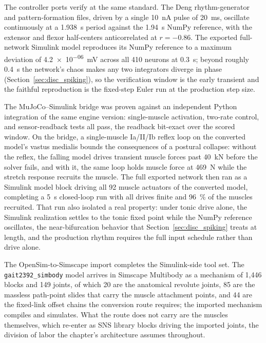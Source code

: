 The controller ports verify at the same standard. The Deng rhythm-generator and pattern-formation files, driven by a single \qty{10}{\nA} pulse of \qty{20}{\milli\second}, oscillate continuously at a \qty{1.938}{\second} period against the \qty{1.94}{\second} NumPy reference, with the extensor and flexor half-centers anticorrelated at $r = -0.86$. The exported full-network Simulink model reproduces its NumPy reference to a maximum deviation of \qty{4.2e-06}{\milli\volt} across all 410 neurons at \qty{0.3}{\second}; beyond roughly \qty{0.4}{\second} the network's chaos makes any two integrators diverge in phase (Section~\ref{sec:disc_spiking}), so the verification window is the early transient and the faithful reproduction is the fixed-step Euler run at the production step size.

The MuJoCo--Simulink bridge was proven against an independent Python integration of the same engine version: single-muscle activation, two-rate control, and sensor-readback tests all pass, the readback bit-exact over the scored window. On the bridge, a single-muscle Ia/II/Ib reflex loop on the converted model's vastus medialis bounds the consequences of a postural collapse: without the reflex, the falling model drives transient muscle forces past \qty{40}{\kilo\newton} before the solver fails, and with it, the same loop holds muscle force at \qty{469}{\newton} while the stretch response recruits the muscle. The full exported network then ran as a Simulink model block driving all 92 muscle actuators of the converted model, completing a \qty{5}{\second} closed-loop run with all drives finite and \qty{96}{\percent} of the muscles recruited. That run also isolated a real property: under tonic drive alone, the Simulink realization settles to the tonic fixed point while the NumPy reference oscillates, the near-bifurcation behavior that Section~\ref{sec:disc_spiking} treats at length, and the production rhythm requires the full input schedule rather than drive alone.

The OpenSim-to-Simscape import completes the Simulink-side tool set. The \texttt{gait2392\_simbody} model arrives in Simscape Multibody as a mechanism of 1,446 blocks and 149 joints, of which 20 are the anatomical revolute joints, 85 are the massless path-point slides that carry the muscle attachment points, and 44 are the fixed-link offset chains the conversion route requires; the imported mechanism compiles and simulates. What the route does not carry are the muscles themselves, which re-enter as SNS library blocks driving the imported joints, the division of labor the chapter's architecture assumes throughout.

